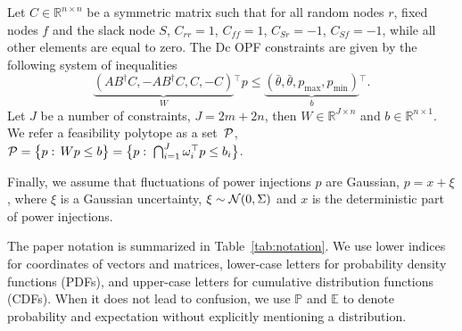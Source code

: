 \documentclass{IEEEtran4PSCC}
\newcommand{\cP}{{\cal P}}
\newcommand{\cN}{{\cal N}}
\begin{document}
Let $C \in \mathbb{R}^{n\times n}$ be a symmetric matrix such that for all random nodes $r$, fixed nodes $f$ and the slack node $S$, $C_{rr} = 1$, $C_{ff} = 1$, $C_{Sr} = - 1$, $C_{Sf} = - 1$, while all other elements are equal to zero. The Dc OPF constraints are given by the following system of inequalities 
\[
\underbrace{(AB^\dagger C, - A B^\dagger C, C, -C)}_{W}\!\!{}^\top p \le \underbrace{(\bar\theta, \bar\theta, p_{\max}, p_{\min})}_b\!\!{}^\top. 
\]
Let $J$ be a number of constraints, $J = 2m + 2n$, then $W\in\mathbb{R}^{J\times n}$ and $b\in\mathbb{R}^{n\times 1}$. We refer a feasibility polytope as a set~$\cP$, 
$\cP = \bigl\{p:\, Wp \le b\bigr\} = \bigl\{p:\; \bigcap_{i=1}^J\omega_i^\top p \le b_i\bigr\}$.

Finally, we assume that fluctuations of power injections $p$ are Gaussian, $p = x +\xi$, where $\xi$ is a Gaussian uncertainty, $\xi\sim\cN(0, \Sigma)$ and $x$ is the deterministic part of power injections. 

The paper notation is summarized in Table~\ref{tab:notation}. We use lower indices for coordinates of vectors and matrices, lower-case letters for probability density functions (PDFs), and upper-case letters for cumulative distribution functions (CDFs). When it does not lead to confusion, we use $\mathbb{P}$ and $\mathbb{E}$ to denote probability and expectation without explicitly mentioning a distribution. 
\end{document}
